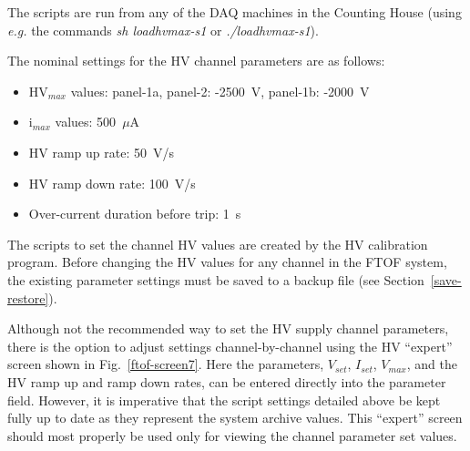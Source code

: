 \documentclass[12pt]{article}
\begin{document}
The scripts are run from any of the DAQ machines in the Counting House (using {\it e.g.}
the commands {\it sh loadhvmax-s1} or {\it ./loadhvmax-s1}).

The nominal settings for the HV channel parameters are as follows:

\begin{itemize}
\item HV$_{max}$ values: panel-1a, panel-2: -2500~V, panel-1b: -2000~V
\item i$_{max}$ values: 500~$\mu$A
\item HV ramp up rate: 50~V/s
\item HV ramp down rate: 100~V/s
\item Over-current duration before trip: 1~s
\end{itemize}

The scripts to set the channel HV values are created by the HV calibration program. 
Before changing the HV values for any channel in the FTOF system, the existing parameter 
settings must be saved to a backup file (see Section~\ref{save-restore}).

Although not the recommended way to set the HV supply channel parameters, there is the 
option to adjust settings channel-by-channel using the HV ``expert'' screen shown in 
Fig.~\ref{ftof-screen7}. Here the parameters, $V_{set}$, $I_{set}$, $V_{max}$, and the HV 
ramp up and ramp down rates, can be entered directly into the parameter field. However, 
it is imperative that the script settings detailed above be kept fully up to date as 
they represent the system archive values. This ``expert'' screen should most properly 
be used only for viewing the channel parameter set values.
\end{document}
